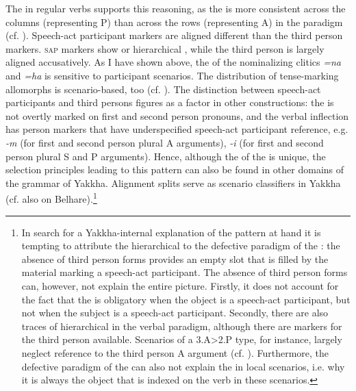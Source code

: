 The   in regular verbs supports this reasoning, as the  is more consistent across the columns (representing P) than across the rows (representing A) in the paradigm (cf. \citealt{Schackow2012_Grammatical}). Speech-act participant markers are aligned different than the third person markers. \textsc{sap} markers show  or hierarchical , while the third person is largely aligned accusatively. As I have shown above, the  of the nominalizing clitics \emph{=na} and \emph{=ha} is sensitive to participant scenarios.  The distribution of tense-marking allomorphs is scenario-based, too (cf. ).  The distinction between speech-act participants and third persons figures as a factor in other constructions: the   is not overtly marked on first and second person pronouns, and the verbal inflection has person markers that have underspecified speech-act participant reference, e.g. \emph{-m} (for first and second person plural A arguments), \emph{-i} (for first and second person plural S and P arguments). Hence, although the  of the  is unique, the selection principles leading to this pattern can also be found in other domains of the grammar of Yakkha. Alignment splits serve as scenario classifiers in Yakkha (cf. also \citealt{Bickel1992Motivation} on Belhare).\footnote{In search for a  Yakkha-internal explanation of the pattern at hand it is tempting to attribute the hierarchical  to the defective paradigm of the : the absence of third person forms provides an empty slot that is filled by the material marking a speech-act participant. The absence of third person forms can, however, not explain the entire picture.  Firstly, it does not account for the fact that the  is obligatory when the object is a speech-act participant, but not when the subject is a speech-act participant. Secondly, there are also traces of hierarchical  in the verbal paradigm, although there are markers for the third person available. Scenarios of a 3.A>2.P type, for instance, largely neglect reference to the third person A argument (cf. ). Furthermore, the defective paradigm of the  can also not explain the   in local scenarios, i.e. why it is always the object that is indexed on the verb in these scenarios.}


